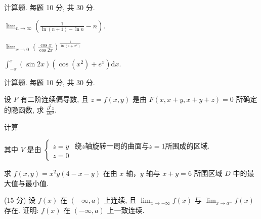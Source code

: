 \par{}
计算题. 每题 10 分, 共 30 分.\par
$\lim_{n\to \infty}\left(\frac{1}{\ln(n + 1) - \ln n} -n\right).$\par
$\lim_{x\to0}\left(\frac{\cos x}{\cos 2x}\right)^{\frac{1}{\ln(1+x^{2})}}$\par
$\int_{-\pi}^{\pi}(\sin2x)(\cos(x^{2})+e^{x})\mathrm{d}x.$\par
\par{}
计算题. 每题 10 分, 共 30 分.\par
设 $F$ 有二阶连续偏导数, 且 $z = f(x, y)$ 是由 $F(x, x + y, x + y + z) = 0$ 所确定的隐函数, 求 $\frac{\partial^2 z}{\partial x^2}$.\par
\par{}
计算\par
\nopagebreak[4]
其中 $V$ 是由 $\left\{ \begin{array}{ll}z = y & \text{绕} z\text{轴旋转一周的曲面与} z = 1\text{所围成的区域}.\\ z = 0 & \end{array} \right.$\par
求 $f(x, y) = x^2 y (4 - x - y)$ 在由 $x$ 轴，$y$ 轴与 $x + y = 6$ 所围区域 $D$ 中的最大值与最小值.\par
\par{}
(15 分) 设 $f(x)$ 在 $(- \infty, a)$ 上连续, 且 $\lim_{x \to -\infty} f(x)$ 与 $\lim_{x \to a^{-}} f(x)$ 存在. 证明: $f(x)$ 在 $(- \infty, a)$ 上一致连续.\par
